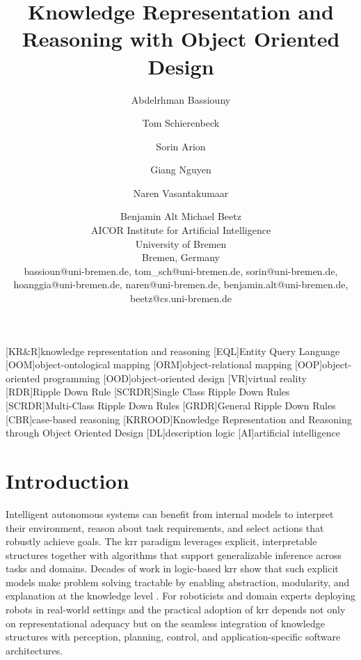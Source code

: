 \documentclass{article}
\title{Knowledge Representation and Reasoning with Object Oriented Design}
\author{
Abdelrhman Bassiouny\and
Tom Schierenbeck\and
Sorin Arion\and
Giang Nguyen\and
Naren Vasantakumaar\and
Benjamin Alt\And
Michael Beetz\\
\affiliations
AICOR Institute for Artificial Intelligence\\
University of Bremen\\
Bremen, Germany\\
\emails
bassioun@uni-bremen.de,
tom\_sch@uni-bremen.de,
sorin@uni-bremen.de,
hoanggia@uni-bremen.de,
naren@uni-bremen.de,
benjamin.alt@uni-bremen.de,
beetz@cs.uni-bremen.de
}
\begin{document}
[KR\&R]{knowledge representation and reasoning}
[EQL]{Entity Query Language}
[OOM]{object-ontological mapping}
[ORM]{object-relational mapping}
[OOP]{object-oriented programming}
[OOD]{object-oriented design}
[VR]{virtual reality}
[RDR]{Ripple Down Rule}
[SCRDR]{Single Class Ripple Down Rules}
[SCRDR]{Multi-Class Ripple Down Rules}
[GRDR]{General Ripple Down Rules}
[CBR]{case-based reasoning}
[KRROOD]{Knowledge Representation and Reasoning through Object Oriented Design}
[DL]{description logic}
[AI]{artificial intelligence}




\section{Introduction}
\label{sec:introduction}

Intelligent autonomous systems can benefit from internal models to interpret their environment, reason about task requirements, and select actions that robustly achieve goals. The \ac{krr} paradigm leverages explicit, interpretable structures together with algorithms that support generalizable inference across tasks and domains. Decades of work in logic-based \ac{krr} show that such explicit models make problem solving tractable by enabling abstraction, modularity, and explanation at the knowledge level \cite{newell1982knowledge}. For roboticists and domain experts deploying robots in real-world settings and the practical adoption of \ac{krr} depends not only on representational adequacy but on the seamless integration of knowledge structures with perception, planning, control, and application-specific software architectures.
\end{document}
